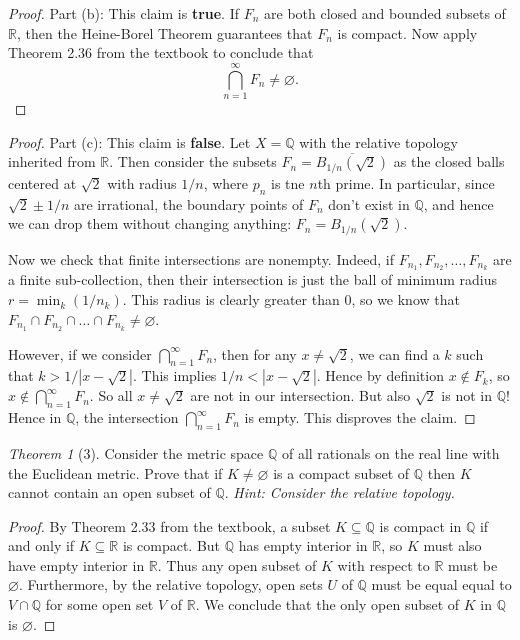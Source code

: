 \documentclass[12pt]{article}
\theoremstyle{remark}
\theoremstyle{named}
\newtheorem*{theorem}{Theorem}
\begin{document}
\begin{proof}
    Part (b): This claim is \textbf{true}. If \(F_n\) are both closed and bounded subsets of \(\mathbb R\), then the Heine-Borel Theorem guarantees that \(F_n\) is compact. Now apply Theorem 2.36 from the textbook to conclude that 
    \[\bigcap_{n = 1}^\infty F_n \neq \varnothing.\]
\end{proof}

\begin{proof}
    Part (c): This claim is \textbf{false}. Let \(X = \mathbb Q\) with the relative topology inherited from \(\mathbb R\). Then consider the subsets \(F_n = \overline{B_{1/ n}(\sqrt 2)}\) as the closed balls centered at \(\sqrt 2\) with radius \(1 / n\), where \(p_n\) is tne \(n\)th prime. 
    In particular, since \(\sqrt 2 \pm 1 / n\) are irrational, the boundary points of \(F_n\) don't exist in \(\mathbb Q\), and hence we can drop them without changing anything: \(F_n = B_{1/n}(\sqrt 2)\).

    Now we check that finite intersections are nonempty. Indeed, if \(F_{n_1}, F_{n_2}, \dots, F_{n_k}\) are a finite sub-collection, then their intersection is just the ball of minimum radius \(r = \min_{k} (1/n_k)\). This radius is clearly greater than \(0\), so we know that \(F_{n_1} \cap F_{n_2} \cap \dots \cap F_{n_k} \neq \varnothing\).

    However, if we consider \(\bigcap_{n = 1}^\infty F_n\), then for any \(x \neq \sqrt 2\), we can find a \(k\) such that \(k > 1 / |x - \sqrt 2|\). This implies \(1 / n < |x - \sqrt 2|\). Hence by definition \(x \notin F_k\), so \(x \notin \bigcap_{n = 1}^\infty F_n\). So all \(x \neq \sqrt 2\) are not in our intersection. But also \(\sqrt 2\) is not in \(\mathbb Q\)! Hence in \(\mathbb Q\), the intersection \(\bigcap_{n = 1}^\infty F_n\) is empty. This disproves the claim.
\end{proof}

\newpage

\begin{theorem}[3]
    Consider the metric space \(\mathbb Q\) of all rationals on the real line with the Euclidean metric. Prove that if \(K \neq \varnothing\) is a compact subset of \(\mathbb Q\) then \(K\) cannot contain an open subset of \(\mathbb Q\). \textit{Hint: Consider the relative topology.}
\end{theorem}

\begin{proof}
    By Theorem 2.33 from the textbook, a subset \(K \subseteq \mathbb Q\) is compact in \(\mathbb Q\) if and only if \(K \subseteq \mathbb R\) is compact. But \(\mathbb Q\) has empty interior in \(\mathbb R\), so \(K\) must also have empty interior in \(\mathbb R\). Thus any open subset of \(K\) with respect to \(\mathbb R\) must be \(\varnothing\). 
    Furthermore, by the relative topology, open sets \(U\) of \(\mathbb Q\) must be equal equal to \(V \cap \mathbb Q\) for some open set \(V\) of \(\mathbb R\). We conclude that the only open subset of \(K\) in \(\mathbb Q\) is \(\varnothing\).
\end{proof}
\end{document}
